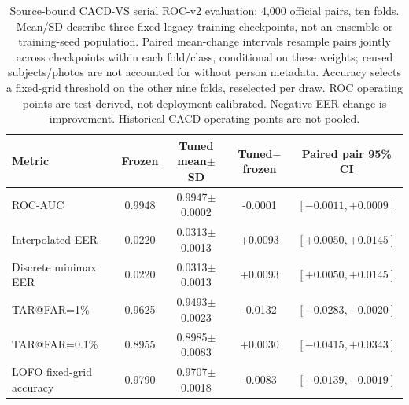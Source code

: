 \begin{table}[!t]
\caption{Source-bound CACD-VS serial ROC-v2 evaluation: 4{,}000 official pairs, ten folds. Mean/SD describe three fixed legacy training checkpoints, not an ensemble or training-seed population. Paired mean-change intervals resample pairs jointly across checkpoints within each fold/class, conditional on these weights; reused subjects/photos are not accounted for without person metadata. Accuracy selects a fixed-grid threshold on the other nine folds, reselected per draw. ROC operating points are test-derived, not deployment-calibrated. Negative EER change is improvement. Historical CACD operating points are not pooled.}
\label{tab:cacd-serial-roc-v2}
\centering\footnotesize
\begin{tabular}{@{}lcccc@{}}
\toprule
Metric & Frozen & Tuned mean$\pm$SD & Tuned$-$frozen & Paired pair 95\% CI \\
\midrule
ROC-AUC & 0.9948 & 0.9947$\pm$0.0002 & -0.0001 & $[-0.0011,+0.0009]$ \\
Interpolated EER & 0.0220 & 0.0313$\pm$0.0013 & +0.0093 & $[+0.0050,+0.0145]$ \\
Discrete minimax EER & 0.0220 & 0.0313$\pm$0.0013 & +0.0093 & $[+0.0050,+0.0145]$ \\
TAR@FAR=1\% & 0.9625 & 0.9493$\pm$0.0023 & -0.0132 & $[-0.0283,-0.0020]$ \\
TAR@FAR=0.1\% & 0.8955 & 0.8985$\pm$0.0083 & +0.0030 & $[-0.0415,+0.0343]$ \\
LOFO fixed-grid accuracy & 0.9790 & 0.9707$\pm$0.0018 & -0.0083 & $[-0.0139,-0.0019]$ \\
\bottomrule
\end{tabular}
\end{table}
